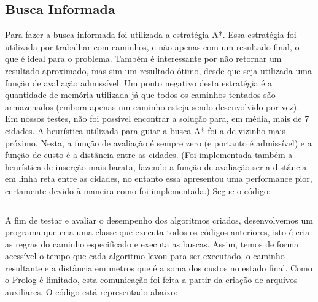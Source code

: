 \documentclass[12pt,a4paper]{article}
\begin{document}
\subsection{Busca Informada}
Para fazer a busca informada foi utilizada a estratégia A*. Essa estratégia foi utilizada por trabalhar com caminhos, e não apenas com um resultado final, o que é ideal para o problema. Também é interessante por não retornar um resultado aproximado, mas sim um resultado ótimo, desde que seja utilizada uma função de avaliação admissível. 
	Um ponto negativo desta estratégia é a quantidade de memória utilizada já que todos os caminhos tentados são armazenados (embora apenas um caminho esteja sendo desenvolvido por vez). Em nossos testes, não foi possível encontrar a solução para, em média, mais de 7 cidades.
  A heurística utilizada para guiar a busca A* foi a de vizinho mais próximo. Nesta, a função de avaliação é sempre zero (e portanto é admissível) e a função de custo é a distância entre as cidades. (Foi implementada também a heurística de inserção mais barata, fazendo a função de avaliação ser a distância em linha reta entre as cidades, no entanto essa apresentou uma performance pior, certamente devido à maneira como foi implementada.)
  Segue o código:

  \begin{mdframed}[linecolor=black, topline=true, bottomline=true,
  leftline=false, rightline=false, backgroundcolor=yellow!10!white]
\inputminted[tabsize=2,linenos=true,fontsize=\footnotesize,breaklines=true,breakafter=format]{prolog}{../buscaInformada_A.pl}
\end{mdframed}
  \label{Code:3}

A fim de testar e avaliar o desempenho dos algoritmos criados, desenvolvemos um programa que cria uma classe que executa todos os códigos anteriores, isto é cria as regras do caminho especificado e executa as buscas. Assim, temos de forma acessível o tempo que cada algoritmo levou para ser executado, o caminho resultante e a distância em metros que é a soma dos custos no estado final. Como o Prolog é limitado, esta comunicação foi feita a partir da criação de arquivos auxiliares. O código está representado abaixo:

  \begin{mdframed}[linecolor=black, topline=true, bottomline=true,leftline=false, rightline=false, backgroundcolor=yellow!10!white]
\inputminted[tabsize=2,linenos=true,fontsize=\footnotesize,breaklines=true,breakafter=format]{python}{../PrologIO.py}
\end{mdframed}
  \label{Code:4}
\newpage
\end{document}
